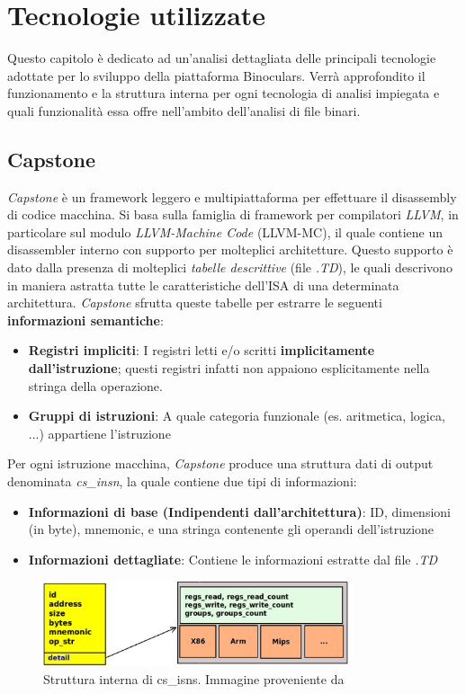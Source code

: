 \documentclass[../main.tex]{subfiles}
\begin{document}
\chapter{Tecnologie utilizzate}
\label{chap:conclusion}
Questo capitolo è dedicato ad un'analisi dettagliata delle principali tecnologie adottate per lo sviluppo della piattaforma Binoculars.
Verrà approfondito il funzionamento e la struttura interna per ogni tecnologia di analisi impiegata e quali funzionalità essa offre nell'ambito dell'analisi di
file binari.
\section{Capstone}
\textit{Capstone} \cite{Capstone_docs} è un framework leggero e multipiattaforma per effettuare il disassembly di codice macchina.
Si basa sulla famiglia di framework per compilatori \textit{LLVM}, in particolare sul modulo \textit{LLVM-Machine Code} (LLVM-MC), il quale contiene un disassembler interno con supporto
per molteplici architetture. Questo supporto è dato dalla presenza di molteplici \textit{tabelle descrittive} (file \textit{.TD}), le quali descrivono in maniera astratta tutte le caratteristiche
dell'ISA di una determinata architettura. 
\textit{Capstone} sfrutta queste tabelle per estrarre le seguenti \textbf{informazioni semantiche}:
\begin{itemize}
    \item \textbf{Registri impliciti}: I registri letti e/o scritti \textbf{implicitamente dall'istruzione}; questi registri infatti non appaiono esplicitamente nella stringa della operazione.
    \item \textbf{Gruppi di istruzioni}: A quale categoria funzionale (es. aritmetica, logica, ...) appartiene l'istruzione
\end{itemize}
Per ogni istruzione macchina, \textit{Capstone} produce una struttura dati di output denominata \textit{cs\_insn}, la quale contiene due tipi di informazioni:
\begin{itemize}
    \item \textbf{Informazioni di base (Indipendenti dall'architettura)}: ID, dimensioni (in byte), mnemonic, e una stringa contenente gli operandi dell'istruzione
    \item \textbf{Informazioni dettagliate}: Contiene le informazioni estratte dal file \textit{.TD}
\end{itemize} 
\begin{figure}[H]
    \centering
    \includegraphics[width = 0.80\textwidth]{../images/cs_isns.png}
    \caption{Struttura interna di cs\_isns. Immagine proveniente da \cite{Capstone_docs}}
\end{figure}
\end{document}
